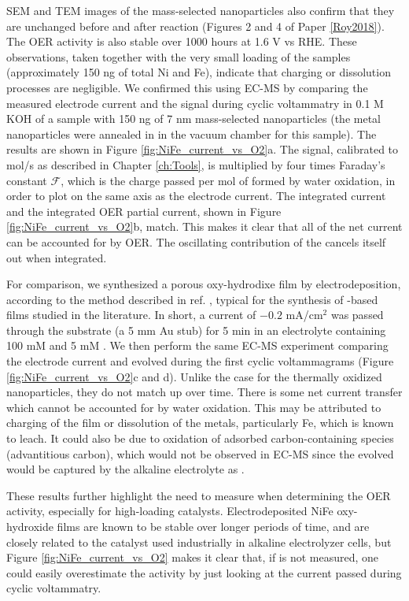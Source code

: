 SEM and TEM images of the mass-selected nanoparticles also confirm that they are unchanged before and after reaction (Figures 2 and 4 of Paper \ref{Roy2018}). The OER activity is also stable over 1000 hours at 1.6 V vs RHE. These observations, taken together with the very small loading of the samples (approximately 150 ng of total Ni and Fe), indicate that charging or dissolution processes are negligible. We confirmed this using EC-MS by comparing the measured electrode current and the  signal during cyclic voltammatry in 0.1 M KOH of a sample with 150 ng of 7 nm mass-selected  nanoparticles (the metal nanoparticles were annealed in  in the vacuum chamber for this sample). The results are shown in Figure \ref{fig:NiFe_current_vs_O2}a. The  signal, calibrated to mol/s as described in Chapter \ref{ch:Tools}, is multiplied by four times Faraday's constant $\mathcal{F}$, which is the charge passed per mol of  formed by water oxidation, in order to plot on the same axis as the electrode current. The integrated current and the integrated OER partial current, shown in Figure \ref{fig:NiFe_current_vs_O2}b, match. This makes it clear that all of the net current can be accounted for by OER. The oscillating contribution of the  cancels itself out when integrated.

For comparison, we synthesized a porous  oxy-hydrodixe film by electrodeposition, according to the method described in ref. , typical for the synthesis of -based films studied in the literature\cite{Dionigi2016b}. In short, a current of $-0.2$ mA/cm$^2$ was passed through the substrate (a 5 mm Au stub) for 5 min in an electrolyte containing 100 mM  and 5 mM . We then perform the same EC-MS experiment comparing the electrode current and evolved  during the first cyclic voltammagrams (Figure \ref{fig:NiFe_current_vs_O2}c and d). Unlike the case for the thermally oxidized nanoparticles, they do not match up over time. There is some net current transfer which cannot be accounted for by water oxidation. This may be attributed to charging of the film or dissolution of the metals, particularly Fe, which is known to leach. It could also be due to oxidation of adsorbed carbon-containing species (advantitious carbon), which would not be observed in EC-MS since the evolved  would be captured by the alkaline electrolyte as .

These results further highlight the need to measure  when determining the OER activity, especially for high-loading catalysts. Electrodeposited NiFe oxy-hydroxide films are known to be stable over longer periods of time, and are closely related to the catalyst used industrially in alkaline electrolyzer cells, but Figure \ref{fig:NiFe_current_vs_O2} makes it clear that, if  is not measured, one could easily overestimate the activity by just looking at the current passed during cyclic voltammatry.